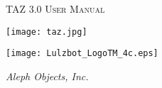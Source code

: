 \date {}
\thispagestyle{empty}
\begingroup
\centering 

\begin{center}
{\huge \scshape TAZ 3.0 User Manual}

\end{center}

\par


\texttt{[image: taz.jpg]}

\begin{center}
\texttt{[image: Lulzbot\_LogoTM\_4c.eps]}

{\large \itshape Aleph Objects, Inc.}
\end{center}
\endgroup

